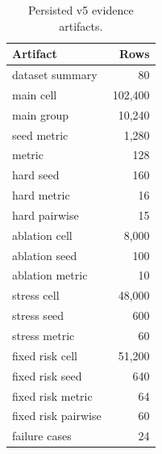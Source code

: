 \begin{table}[t]
\centering
\caption{Persisted v5 evidence artifacts.}
\label{tab:row-counts}
\begin{tabular}{lr}
\toprule
Artifact & Rows \\
\midrule
dataset summary & 80 \\
main cell & 102,400 \\
main group & 10,240 \\
seed metric & 1,280 \\
metric & 128 \\
hard seed & 160 \\
hard metric & 16 \\
hard pairwise & 15 \\
ablation cell & 8,000 \\
ablation seed & 100 \\
ablation metric & 10 \\
stress cell & 48,000 \\
stress seed & 600 \\
stress metric & 60 \\
fixed risk cell & 51,200 \\
fixed risk seed & 640 \\
fixed risk metric & 64 \\
fixed risk pairwise & 60 \\
failure cases & 24 \\
\bottomrule
\end{tabular}
\end{table}
